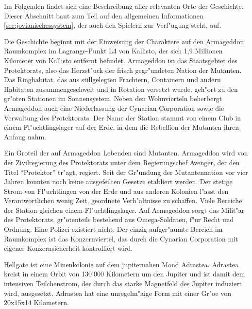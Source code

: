 

Im Folgenden findet sich eine Beschreibung aller relevanten Orte der Geschichte. Dieser Abschnitt baut zum Teil auf den allgemeinen Informationen \cref{sec:jovianischessystem}, der auch den Spielern zur Verf"ugung steht, auf.


Die Geschichte beginnt mit der Einweisung der Charaktere auf den Armageddon Raumkomplex im Lagrange-Punkt L4 von Kallisto, der sich 1,9 Millionen Kilometer von Kallisto entfernt befindet. Armageddon ist das Staatsgebiet des Protektorats, also das Herzst"uck der frisch gegr"undeten Nation der Mutanten. Das Ringhabitat, das aus stillgelegten Frachtern, Containern und andern Habitaten zusammengeschwei\3t und in Rotation versetzt wurde, geh"ort zu den gr"o\3ten Stationen im Sonnensystem. Neben den Wohnvierteln beherbergt Armageddon auch eine Niederlassung der Cynarian Corporation sowie die Verwaltung des Protektorats. Der Name der Station stammt von einem Club in einem Fl"uchtlingslager auf der Erde, in dem die Rebellion der Mutanten ihren Anfang nahm.

Ein Gro\3teil der auf Armageddon Lebenden sind Mutanten. Armageddon wird von der Zivilregierung des Protektorats unter dem Regierungschef Avenger, der den Titel ``Protektor'' tr"agt, regiert. Seit der Gr"undung der Mutantennation vor vier Jahren konnten noch keine ausgefeilten Gesetze etabliert werden. Der stetige Strom von Fl"uchtlingen von der Erde und aus anderen Kolonien l"asst den Verantwortlichen wenig Zeit, geordnete Verh"altnisse zu schaffen. Viele Bereiche der Station gleichen einem Fl"uchtlingslager. Auf Armageddon sorgt das Milit"ar des Protektorats, gr"o\3tenteils bestehend aus Omega-Soldaten, f"ur Recht und Ordnung. Eine Polizei existiert nicht. Der einzig aufger"aumte Bereich im Raumkomplex ist das Konzernviertel, das durch die Cynarian Corporation mit eigener Konzernsicherheit kontrolliert wird.


Hellgate ist eine Minenkolonie auf dem jupiternahen Mond Adrastea. Adrastea kreist in einem Orbit von 130'000 Kilometern um den Jupiter und
ist damit dem intensiven Teilchenstrom, der durch das starke Magnetfeld des Jupiter induziert wird, ausgesetzt. Adrastea hat eine unregelm"a\3ige Form mit einer Gr"o\3e von 20x15x14 Kilometern.

